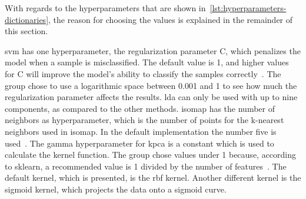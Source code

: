 With regards to the hyperparameters that are shown in~\ref{lst:hyperparameters-dictionaries}, the reason for choosing the values is explained in the remainder of this section.


\gls{svm} has one hyperparameter, the regularization parameter C, which penalizes the model when a sample is misclassified. The default value is 1, and higher values for C will improve the model's ability to classify the samples correctly~\cite{scikit-learn}. The group chose to use a logarithmic space between 0.001 and 1 to see how much the regularization parameter affects the results. \gls{lda} can only be used with up to nine components, as compared to the other methods. \gls{isomap} has the number of neighbors as hyperparameter, which is the number of points for the k-nearest neighbors used in \gls{isomap}. In the default implementation the number five is used~\cite{scikit-learn}. The gamma hyperparameter for \gls{kpca} is a constant which is used to calculate the kernel function. The group chose values under 1 because, according to sklearn, a recommended value is 1 divided by the number of features~\cite{scikit-learn}. The default kernel, which is presented, is the \gls{rbf} kernel. Another different kernel is the sigmoid kernel, which projects the data onto a sigmoid curve. 
